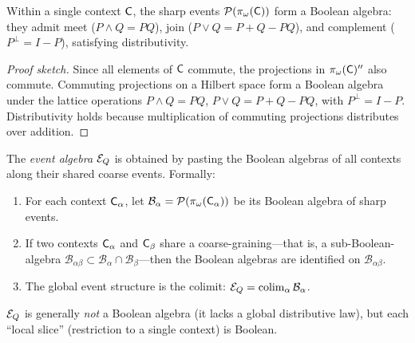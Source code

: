 \begin{proposition}
\label{prop:boolean-within-context}
Within a single context $\mathsf{C}$, the sharp events
$\mathcal{P}(\pi_\omega(\mathsf{C}))$ form a Boolean algebra: they admit
meet ($P \wedge Q = PQ$), join ($P \vee Q = P + Q - PQ$), and
complement ($P^\perp = I - P$), satisfying distributivity.

\begin{proof}[Proof sketch]
Since all elements of $\mathsf{C}$ commute, the projections in
$\pi_\omega(\mathsf{C})''$ also commute.  Commuting projections on a
Hilbert space form a Boolean algebra under the lattice operations
$P \wedge Q = PQ$, $P \vee Q = P + Q - PQ$, with $P^\perp = I - P$.
Distributivity holds because multiplication of commuting projections
distributes over addition.
\end{proof}
\end{proposition}

\begin{definition}
\label{def:event-algebra}
The \emph{event algebra} $\mathcal{E}_Q$ is obtained by pasting the Boolean
algebras of all contexts along their shared coarse events.  Formally:
\begin{enumerate}[nosep, label=(\roman*)]
  \item For each context $\mathsf{C}_\alpha$, let
        $\mathcal{B}_\alpha = \mathcal{P}(\pi_\omega(\mathsf{C}_\alpha))$ be
        its Boolean algebra of sharp events.
  \item If two contexts $\mathsf{C}_\alpha$ and $\mathsf{C}_\beta$ share a
        coarse-graining---that is, a sub-Boolean-algebra
        $\mathcal{B}_{\alpha\beta} \subset \mathcal{B}_\alpha \cap
        \mathcal{B}_\beta$---then the Boolean algebras are identified on
        $\mathcal{B}_{\alpha\beta}$.
  \item The global event structure is the colimit:
        $\mathcal{E}_Q = \mathrm{colim}_\alpha\, \mathcal{B}_\alpha$.
\end{enumerate}
$\mathcal{E}_Q$ is generally \emph{not} a Boolean algebra (it lacks a global
distributive law), but each ``local slice'' (restriction to a single
context) is Boolean.
\end{definition}

